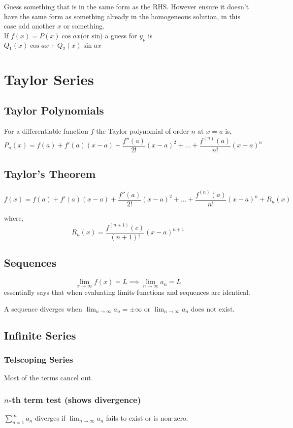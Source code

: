 \documentclass[a4paper,10pt]{article}
\begin{document}
Guess something that is in the same form as the RHS. However ensure it doesn't have the same form as something already in the homogeneous solution, in this case add another $x$ or something.\\
If $f(x) = P(x)\cos ax \mbox{(or sin)}$ a guess for $y_p$ is $Q_1(x)\cos ax + Q_2(x)\sin ax$

\section*{Taylor Series}
\subsection*{Taylor Polynomials}
For a differentiable function $f$ the Taylor polynomial of order $n$ at $x=a$ is,
$$P_n(x) = f(a) + f'(a)(x-a) + \frac{f''(a)}{2!}(x-a)^2 + \dots + \frac{f^{\left( n\right) }(a)}{n!}(x-a)^n$$

\subsection*{Taylor's Theorem}
$$f(x) = f(a) + f'(a)(x-a) + \frac{f''(a)}{2!}(x-a)^2 + \dots + \frac{f^{\left( n\right) }(a)}{n!}(x-a)^n + R_n(x)$$

where,\\
$$R_n(x) = \frac{f^{\left( n+1\right) }(c)}{(n+1)!}(x-a)^{n+1}$$

\subsection*{Sequences}
$$\lim_{x \to \infty} f(x) = L \implies \lim_{n \to \infty}a_n = L$$
essentially says that when evaluating limits functions and sequences are identical.

A sequence diverges when $\displaystyle \lim_{n \to \infty}a_n = \pm \infty$ or $\displaystyle \lim_{n \to \infty}a_n$ does not exist.

\subsection*{Infinite Series}
\subsubsection*{Telscoping Series}
Most of the terms cancel out.

\subsubsection*{$n$-th term test (shows divergence)}
$\displaystyle \sum_{n=1}^{\infty} a_n$ diverges if $\displaystyle \lim_{n \to \infty}{a_n}$ fails to exist or is non-zero.
\end{document}
